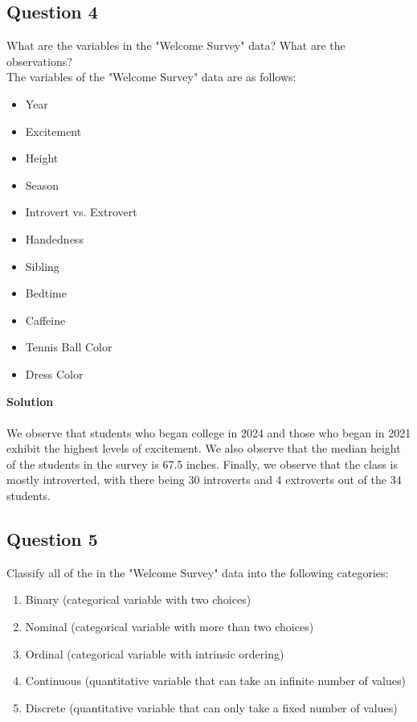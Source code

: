 \documentclass[12pt]{article}
\begin{document}
\subsection*{Question 4}
What are the variables in the "Welcome Survey" data? What are the observations?\\ 
The variables of the "Welcome Survey" data are as follows:
\begin{itemize}
  \item Year
  \item Excitement
  \item Height 
  \item Season 
  \item Introvert vs. Extrovert 
  \item Handedness
  \item Sibling
  \item Bedtime 
  \item Caffeine
  \item Tennis Ball Color
  \item Dress Color 
\end{itemize}

\textbf{Solution}\\ 
\\ 
We observe that students who began college in 2024 and those who began in 2021 exhibit the highest levels of excitement. 
We also observe that the median height of the students in the survey is 67.5 inches. Finally, we observe that the class 
is mostly introverted, with there being 30 introverts and 4 extroverts out of the 34 students. 
\vspace{0.25in}
\subsection*{Question 5}
Classify all of the in the "Welcome Survey" data into the following categories:
\begin{enumerate}
  \item Binary (categorical variable with two choices)
  \item Nominal (categorical variable with more than two choices)
  \item Ordinal (categorical variable with intrinsic ordering)
  \item Continuous (quantitative variable that can take an infinite number of values)
  \item Discrete (quantitative variable that can only take a fixed number of values)
\end{enumerate}
\end{document}
